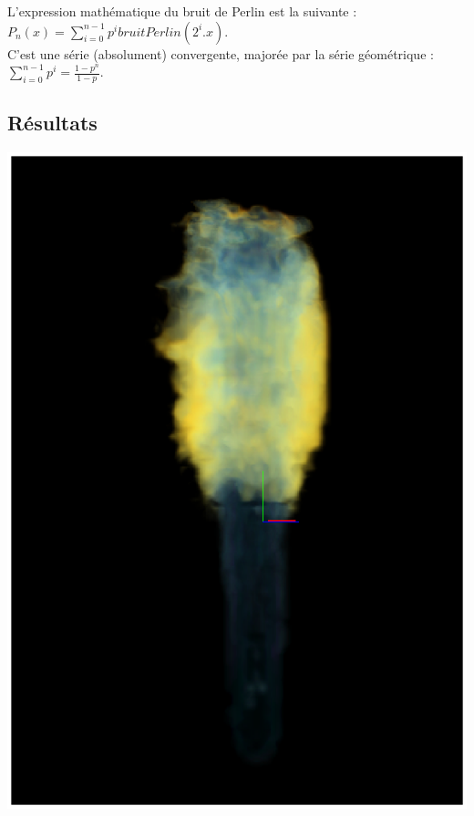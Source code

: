 \documentclass[a4paper,10pt]{article}
\begin{document}
L'expression mathématique du bruit de Perlin est la suivante :\\
$P_n(x) = \sum_{i=0}^{n-1} p^i bruitPerlin(2^i.x)$.\\
C'est une série (absolument) convergente, majorée par la série géométrique :\\
$\sum_{i=0}^{n-1} p^i = \frac{1 - p^n}{1 - p}$.\\

\subsection{Résultats}


    \begin{center}
	\includegraphics[scale=0.7]{FlammeBleue.ps}

\end{center}
\end{document}
